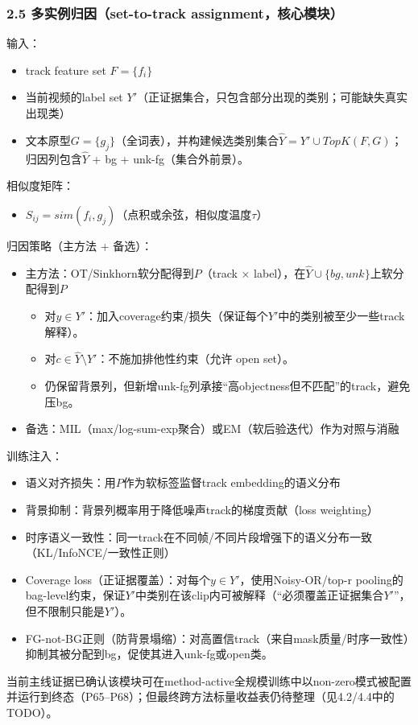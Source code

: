 \documentclass[UTF8]{ctexart}
\begin{document}
\subsubsection*{2.5 多实例归因（set-to-track assignment，核心模块）}
输入：
\begin{itemize}
\item track feature set $F=\{f_i\}$
\item 当前视频的label set $Y'$（正证据集合，只包含部分出现的类别；可能缺失真实出现类）
\item 文本原型$G=\{g_j\}$（全词表），并构建候选类别集合$\hat{Y}=Y'\cup TopK(F, G)$；归因列包含$\hat{Y}$ + bg + unk-fg（集合外前景）。
\end{itemize}
相似度矩阵：
\begin{itemize}
\item $S_{ij} = sim(f_i, g_j)$（点积或余弦，相似度温度$\tau$）
\end{itemize}
归因策略（主方法 + 备选）：
\begin{itemize}
\item 主方法：OT/Sinkhorn软分配得到$P$（track × label），在$\hat{Y}\cup\{bg,unk\}$上软分配得到$P$
\begin{itemize}
\item 对$y\in Y'$：加入coverage约束/损失（保证每个$Y'$中的类别被至少一些track解释）。
\item 对$c\in \hat{Y}\setminus Y'$：不施加排他性约束（允许 open set）。
\item 仍保留背景列，但新增unk-fg列承接“高objectness但不匹配”的track，避免压bg。
\end{itemize}
\item 备选：MIL（max/log-sum-exp聚合）或EM（软后验迭代）作为对照与消融
\end{itemize}
训练注入：
\begin{itemize}
\item 语义对齐损失：用$P$作为软标签监督track embedding的语义分布
\item 背景抑制：背景列概率用于降低噪声track的梯度贡献（loss weighting）
\item 时序语义一致性：同一track在不同帧/不同片段增强下的语义分布一致（KL/InfoNCE/一致性正则）
\item Coverage loss（正证据覆盖）：对每个$y\in Y'$，使用Noisy-OR/top-r pooling的bag-level约束，保证$Y'$中类别在该clip内可被解释（“必须覆盖正证据集合$Y'$”，但不限制只能是$Y'$）。
\item FG-not-BG正则（防背景塌缩）：对高置信track（来自mask质量/时序一致性）抑制其被分配到bg，促使其进入unk-fg或open类。
\end{itemize}
当前主线证据已确认该模块可在method-active全规模训练中以non-zero模式被配置并运行到终态（P65--P68）；但最终跨方法标量收益表仍待整理（见4.2/4.4中的TODO）。
\end{document}
